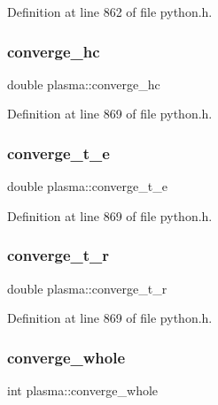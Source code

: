Definition at line 862 of file python.\+h.

\mbox{\label{structplasma_ac74499cb432f536f838a1f4e4eccf5bc}} 
\subsubsection{\texorpdfstring{converge\+\_\+hc}{converge\_hc}}
{\footnotesize\ttfamily double plasma\+::converge\+\_\+hc}



Definition at line 869 of file python.\+h.

\mbox{\label{structplasma_a7dc5aebabe90a8a5fa17ed2585de401c}} 
\subsubsection{\texorpdfstring{converge\+\_\+t\+\_\+e}{converge\_t\_e}}
{\footnotesize\ttfamily double plasma\+::converge\+\_\+t\+\_\+e}



Definition at line 869 of file python.\+h.

\mbox{\label{structplasma_a41bc8bd1fad69fdfe93c152eefdd4933}} 
\subsubsection{\texorpdfstring{converge\+\_\+t\+\_\+r}{converge\_t\_r}}
{\footnotesize\ttfamily double plasma\+::converge\+\_\+t\+\_\+r}



Definition at line 869 of file python.\+h.

\mbox{\label{structplasma_a59f5cb4220fd78cea7972db755f58291}} 
\subsubsection{\texorpdfstring{converge\+\_\+whole}{converge\_whole}}
{\footnotesize\ttfamily int plasma\+::converge\+\_\+whole}



